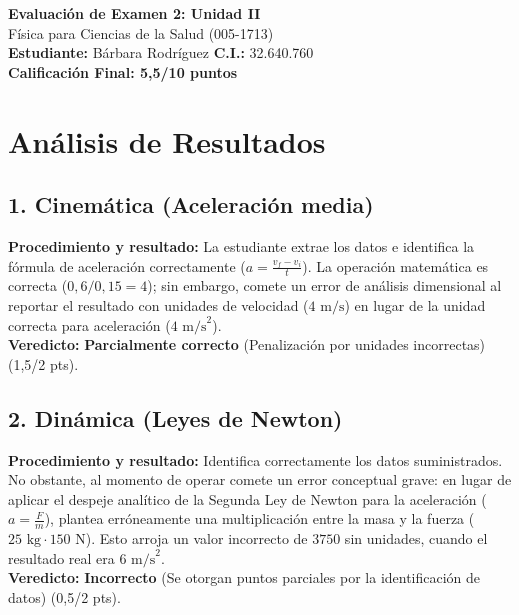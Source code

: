 \documentclass[12pt,letterpaper]{article}
\begin{document}
\begin{center}
    \Large \textbf{Evaluación de Examen 2: Unidad II} \\
    \large Física para Ciencias de la Salud (005-1713) \\
    \vspace{0.5cm}
    \textbf{Estudiante:} Bárbara Rodríguez \quad \textbf{C.I.:} 32.640.760
    \vspace{0.3cm} \\
    \large \textbf{Calificación Final: 5,5/10 puntos}
\end{center}

\vspace{0.5cm}

\section*{Análisis de Resultados}

\subsection*{1. Cinemática (Aceleración media)}
\textbf{Procedimiento y resultado:} La estudiante extrae los datos e identifica la fórmula de aceleración correctamente ($a = \frac{v_f - v_i}{t}$). La operación matemática es correcta ($0,6 / 0,15 = 4$); sin embargo, comete un error de análisis dimensional al reportar el resultado con unidades de velocidad ($4 \text{ m/s}$) en lugar de la unidad correcta para aceleración ($4 \text{ m/s}^2$). \\
\textbf{Veredicto:} \textbf{Parcialmente correcto} (Penalización por unidades incorrectas) (1,5/2 pts).

\subsection*{2. Dinámica (Leyes de Newton)}
\textbf{Procedimiento y resultado:} Identifica correctamente los datos suministrados. No obstante, al momento de operar comete un error conceptual grave: en lugar de aplicar el despeje analítico de la Segunda Ley de Newton para la aceleración ($a = \frac{F}{m}$), plantea erróneamente una multiplicación entre la masa y la fuerza ($25 \text{ kg} \cdot 150 \text{ N}$). Esto arroja un valor incorrecto de $3750$ sin unidades, cuando el resultado real era $6 \text{ m/s}^2$. \\
\textbf{Veredicto:} \textbf{Incorrecto} (Se otorgan puntos parciales por la identificación de datos) (0,5/2 pts).
\end{document}
